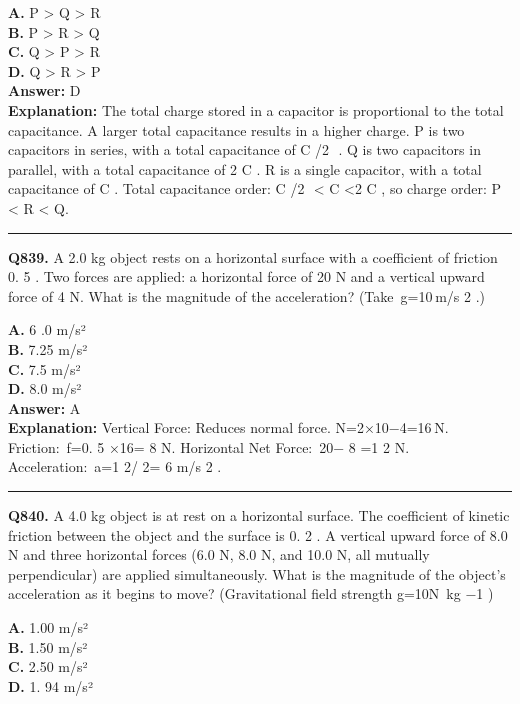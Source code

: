 \documentclass[12pt]{article}
\begin{document}
\textbf{A.} P
>
Q
>
R \\
\textbf{B.} P
>
R
>
Q \\
\textbf{C.} Q
>
P
>
R \\
\textbf{D.} Q
>
R
>
P \\

\textbf{Answer:} D \\
\textbf{Explanation:} The total charge stored in a capacitor is proportional to the total capacitance. A larger total capacitance results in a higher charge.
\cdot 
P
is two capacitors in series, with a total capacitance of
C
/2
​
.
\cdot 
Q
is two capacitors in parallel, with a total capacitance of 2
C
.
\cdot 
R
is a single capacitor, with a total capacitance of
C
.
Total capacitance order:
C
/2
​
<
C
<2
C
, so charge order: P < R < Q.

\hrule
\vspace{1em}


\noindent
\textbf{Q839.} A 2.0 kg object rests on a horizontal surface with a coefficient of friction 0.
5
. Two forces are applied: a horizontal force of 20 N and a vertical upward force of 4 N. What is the magnitude of the acceleration? (Take g=10 m/s
2
.)



\textbf{A.} 6
.0 m/s² \\
\textbf{B.} 7.25 m/s² \\
\textbf{C.} 7.5 m/s² \\
\textbf{D.} 8.0 m/s² \\

\textbf{Answer:} A \\
\textbf{Explanation:} Vertical Force: Reduces normal force.
N=2×10−4=16 N.
Friction: f=0.
5
×16=
8
N.
Horizontal Net Force: 20−
8
=1
2
N.
Acceleration: a=1
2/
2=
6
m/s
2
.

\hrule
\vspace{1em}


\noindent
\textbf{Q840.} A 4.0 kg object is at rest on a horizontal surface. The coefficient of kinetic friction between the object and the surface is 0.
2
. A vertical upward force of 8.0 N and three horizontal forces (6.0 N, 8.0 N, and 10.0 N, all mutually perpendicular) are applied simultaneously. What is the magnitude of the object's acceleration as it begins to move? (Gravitational field strength g=10N kg
−1
)



\textbf{A.} 1.00 m/s² \\
\textbf{B.} 1.50 m/s² \\
\textbf{C.} 2.50 m/s² \\
\textbf{D.} 1.
94
m/s² \\
\end{document}

